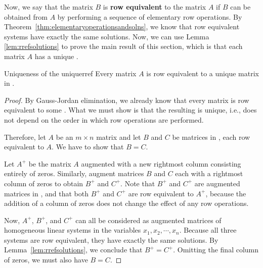 Now, we say that the matrix $B$ is \textbf{row equivalent} to the matrix $A$ if $B$ can be obtained from $A$ by performing a sequence of elementary row operations. By Theorem~\ref{thm:elementaryoperationsandsolns}, we know that row equivalent systems have exactly the same solutions. Now, we can use Lemma \ref{lem:rrefsolutions} to prove the main result of this section, which is that each matrix $A$ has a unique {\rref}.

\begin{theorem}{Uniqueness of the {\rref}}{uniquerref}
  Every matrix $A$ is row equivalent to a unique matrix in {\rref}.
\end{theorem}

\begin{proof}
  By Gauss-Jordan elimination, we already know that every matrix is
  row equivalent to some {\rref}. What we must show is that the
  resulting {\rref} is unique, i.e., does not depend on the order in
  which row operations are performed.
  
  Therefore, let $A$ be an $m \times n$ matrix and let $B$ and $C$ be
  matrices in {\rref}, each row equivalent to $A$. We have to show
  that $B=C$.

  Let $A^{+}$ be the matrix $A$ augmented with a new rightmost column
  consisting entirely of zeros. Similarly, augment matrices $B$ and
  $C$ each with a rightmost column of zeros to obtain $B^{+}$ and
  $C^{+}$. Note that $B^{+}$ and $C^{+}$ are augmented matrices in
  {\rref}, and that both $B^{+}$ and $C^{+}$ are row equivalent to
  $A^{+}$, because the addition of a column of zeros does not change
  the effect of any row operations.

  Now, $A^{+}$, $B^{+}$, and $C^{+}$ can all be considered as
  augmented matrices of homogeneous linear systems in the variables
  $x_1, x_2, \cdots, x_n$. Because all three systems are row
  equivalent, they have exactly the same solutions. By
  Lemma~\ref{lem:rrefsolutions}, we conclude that $B^{+}=C^{+}$.
  Omitting the final column of zeros, we must also have $B=C$.
\end{proof}

